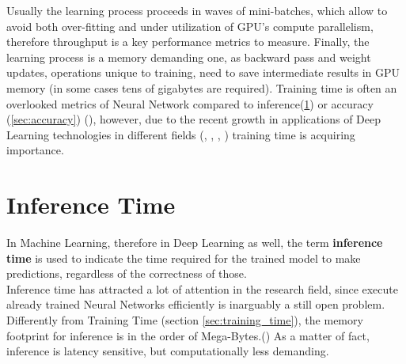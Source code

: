 Usually the learning process proceeds in waves of mini-batches, which allow to avoid both over-fitting and under utilization of GPU’s compute parallelism, therefore throughput is a key performance metrics to measure.\cite{8573476}
Finally, the learning process is a memory demanding one, as  backward pass and weight updates, operations unique to training, need to save intermediate results in GPU memory (in some cases tens of gigabytes are required). \cite{rhu2016vdnn}
Training time is often an overlooked metrics of Neural Network compared to inference(\ref{sec:inference_time_definition}) or accuracy (\ref{sec:accuracy}) (\cite{8573476}), however, due to the recent growth in applications of Deep Learning technologies in different fields (\cite{bojarski2016end}, \cite{huval2015empirical}, \cite{10.1145/2959100}, \cite{amodei2015deep}) training time is acquiring importance. \cite{8573476}\\
\section{Inference Time}\label{sec:inference_time_definition}
In Machine Learning, therefore in Deep Learning as well, the term \textbf{inference time} is used to indicate the time required for the trained model to make predictions, regardless of the correctness of those. \\
Inference time has attracted a lot of attention in the research field, since execute already trained Neural Networks efficiently is inarguably a still open problem. \cite{8573476}\\
Differently from Training Time (section \ref{sec:training_time}), the memory footprint for inference is in the order of Mega-Bytes.(\cite{han2016eie}) As a matter of fact, inference is latency sensitive, but computationally less demanding. \cite{8573476}\\




